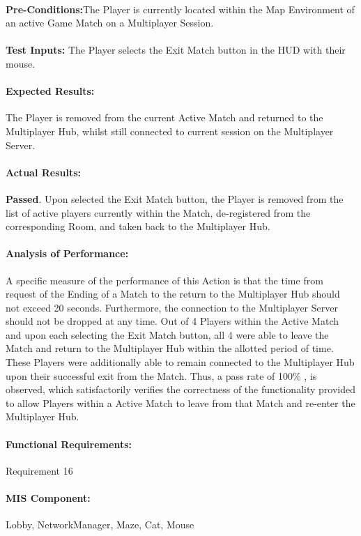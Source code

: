 \documentclass{article}
\begin{document}
    \paragraph{}\textbf{Pre-Conditions:}The Player is currently located within the Map Environment of an active Game Match on a Multiplayer Session.
    \paragraph{}\textbf{Test Inputs:} The Player selects the Exit Match button in the HUD with their mouse.
    \paragraph{Expected Results:} The Player is removed from the current Active Match and returned to the Multiplayer Hub, whilst still connected to current session on the Multiplayer Server. 
    \paragraph{Actual Results:} \textbf{Passed}. Upon selected the Exit Match button, the Player is removed from the list of active players currently within the Match, de-registered from the corresponding Room, and taken back to the Multiplayer Hub.
    \paragraph{Analysis of Performance:} A specific measure of the performance of this Action is that the time from request of the Ending of a Match to the return to the Multiplayer Hub should not exceed 20 seconds. Furthermore, the connection to the Multiplayer Server should not be dropped at any time. Out of 4 Players within the Active Match and upon each selecting the Exit Match button, all 4 were able to leave the Match and return to the Multiplayer Hub within the allotted period of time. These Players were additionally able to remain connected to the Multiplayer Hub upon their successful exit from the Match.  Thus, a pass rate of 100\% , is observed, which satisfactorily verifies the correctness of the functionality provided to allow Players within a Active Match to leave from that Match and re-enter the Multiplayer Hub.
     \paragraph{Functional Requirements:} Requirement 16
    \paragraph{MIS Component:} Lobby, NetworkManager, Maze, Cat, Mouse
    
\end{document}

